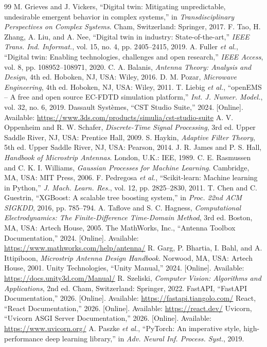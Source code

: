 \documentclass[12pt,a4paper]{article}
\begin{document}
\begin{thebibliography}{99}
 M. Grieves and J. Vickers, ``Digital twin: Mitigating unpredictable, undesirable emergent behavior in complex systems,'' in \textit{Transdisciplinary Perspectives on Complex Systems}. Cham, Switzerland: Springer, 2017.
 F. Tao, H. Zhang, A. Liu, and A. Nee, ``Digital twin in industry: State-of-the-art,'' \textit{IEEE Trans. Ind. Informat.}, vol. 15, no. 4, pp. 2405--2415, 2019.
 A. Fuller \textit{et al.}, ``Digital twin: Enabling technologies, challenges and open research,'' \textit{IEEE Access}, vol. 8, pp. 108952--108971, 2020.
 C. A. Balanis, \textit{Antenna Theory: Analysis and Design}, 4th ed. Hoboken, NJ, USA: Wiley, 2016.
 D. M. Pozar, \textit{Microwave Engineering}, 4th ed. Hoboken, NJ, USA: Wiley, 2011.
 T. Liebig \textit{et al.}, ``openEMS -- A free and open source EC-FDTD simulation platform,'' \textit{Int. J. Numer. Model.}, vol. 32, no. 6, 2019.
 Dassault Syst\`emes, ``CST Studio Suite,'' 2024. [Online]. Available: \url{https://www.3ds.com/products/simulia/cst-studio-suite}
 A. V. Oppenheim and R. W. Schafer, \textit{Discrete-Time Signal Processing}, 3rd ed. Upper Saddle River, NJ, USA: Prentice Hall, 2009.
 S. Haykin, \textit{Adaptive Filter Theory}, 5th ed. Upper Saddle River, NJ, USA: Pearson, 2014.
 J. R. James and P. S. Hall, \textit{Handbook of Microstrip Antennas}. London, U.K.: IEE, 1989.
 C. E. Rasmussen and C. K. I. Williams, \textit{Gaussian Processes for Machine Learning}. Cambridge, MA, USA: MIT Press, 2006.
 F. Pedregosa \textit{et al.}, ``Scikit-learn: Machine learning in Python,'' \textit{J. Mach. Learn. Res.}, vol. 12, pp. 2825--2830, 2011.
 T. Chen and C. Guestrin, ``XGBoost: A scalable tree boosting system,'' in \textit{Proc. 22nd ACM SIGKDD}, 2016, pp. 785--794.
 A. Taflove and S. C. Hagness, \textit{Computational Electrodynamics: The Finite-Difference Time-Domain Method}, 3rd ed. Boston, MA, USA: Artech House, 2005.
 The MathWorks, Inc., ``Antenna Toolbox Documentation,'' 2024. [Online]. Available: \url{https://www.mathworks.com/help/antenna/}
 R. Garg, P. Bhartia, I. Bahl, and A. Ittipiboon, \textit{Microstrip Antenna Design Handbook}. Norwood, MA, USA: Artech House, 2001.
 Unity Technologies, ``Unity Manual,'' 2024. [Online]. Available: \url{https://docs.unity3d.com/Manual/}
 R. Szeliski, \textit{Computer Vision: Algorithms and Applications}, 2nd ed. Cham, Switzerland: Springer, 2022.
 FastAPI, ``FastAPI Documentation,'' 2026. [Online]. Available: \url{https://fastapi.tiangolo.com/}
 React, ``React Documentation,'' 2026. [Online]. Available: \url{https://react.dev/}
 Uvicorn, ``Uvicorn ASGI Server Documentation,'' 2026. [Online]. Available: \url{https://www.uvicorn.org/}
 A. Paszke \textit{et al.}, ``PyTorch: An imperative style, high-performance deep learning library,'' in \textit{Adv. Neural Inf. Process. Syst.}, 2019.
\end{thebibliography}
\end{document}
